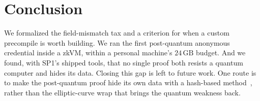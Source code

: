 \section{Conclusion}
We formalized the field-mismatch tax and a criterion for when a custom precompile is worth building. We ran the first post-quantum anonymous credential inside a zkVM, within a personal machine's $24\,\mathrm{GB}$ budget. And we found, with SP1's shipped tools, that no single proof both resists a quantum computer and hides its data. Closing this gap is left to future work. One route is to make the post-quantum proof hide its own data with a hash-based method~\cite{cryptoeprint:2024/1037,cryptoeprint:2026/683}, rather than the elliptic-curve wrap that brings the quantum weakness back.
